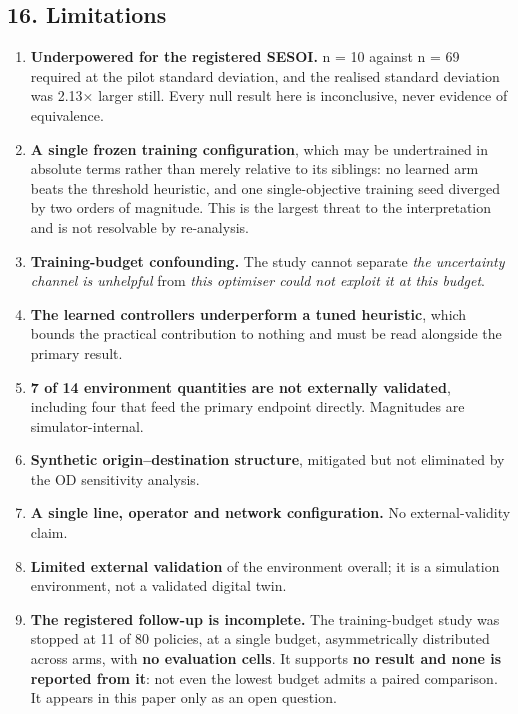 \documentclass[
]{article}
\providecommand{\tightlist}{%
  \setlength{\itemsep}{0pt}\setlength{\parskip}{0pt}}
\begin{document}
\subsection{16. Limitations}\label{16-limitations}

\begin{enumerate}
\def\labelenumi{\arabic{enumi}.}
\tightlist
\item
  \textbf{Underpowered for the registered SESOI.} n = 10 against n = 69
  required at the pilot standard deviation, and the realised standard
  deviation was 2.13× larger still. Every null result here is
  inconclusive, never evidence of equivalence.
\item
  \textbf{A single frozen training configuration}, which may be
  undertrained in absolute terms rather than merely relative to its
  siblings: no learned arm beats the threshold heuristic, and one
  single-objective training seed diverged by two orders of magnitude.
  This is the largest threat to the interpretation and is not resolvable
  by re-analysis.
\item
  \textbf{Training-budget confounding.} The study cannot separate
  \emph{the uncertainty channel is unhelpful} from \emph{this optimiser
  could not exploit it at this budget}.
\item
  \textbf{The learned controllers underperform a tuned heuristic}, which
  bounds the practical contribution to nothing and must be read
  alongside the primary result.
\item
  \textbf{7 of 14 environment quantities are not externally validated},
  including four that feed the primary endpoint directly. Magnitudes are
  simulator-internal.
\item
  \textbf{Synthetic origin--destination structure}, mitigated but not
  eliminated by the OD sensitivity analysis.
\item
  \textbf{A single line, operator and network configuration.} No
  external-validity claim.
\item
  \textbf{Limited external validation} of the environment overall; it is
  a simulation environment, not a validated digital twin.
\item
  \textbf{The registered follow-up is incomplete.} The training-budget
  study was stopped at 11 of 80 policies, at a single budget,
  asymmetrically distributed across arms, with \textbf{no evaluation
  cells}. It supports \textbf{no result and none is reported from it}:
  not even the lowest budget admits a paired comparison. It appears in
  this paper only as an open question.

\end{enumerate}
\end{document}
